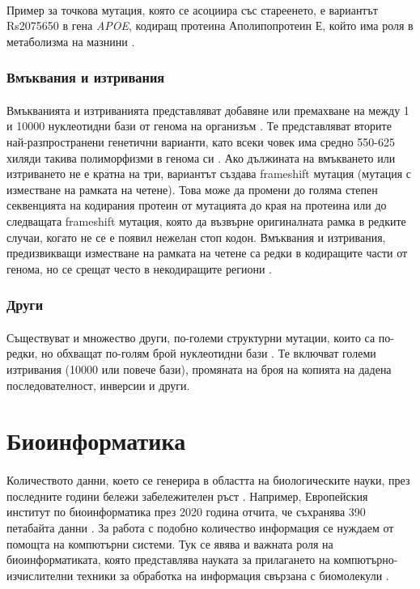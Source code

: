 \documentclass[pdftex,cyrillic,14pt,a4page,twoside,openright]{extreport}
\begin{document}
\paragraph{}
Пример за точкова мутация, която се асоциира със стареенето, е вариантът Rs2075650 в гена \textit{APOE}, кодиращ протеина Аполипопротеин Е, който има роля в метаболизма на мазнини \cite{deelen2011, lu2014}.

\subsubsection{Вмъквания и изтривания}
\paragraph{}
Вмъкванията и изтриванията представляват добавяне или премахване на между 1 и 10000 нуклеотидни бази от генома на организъм \cite{mullaney2010}. Те представляват вторите най-разпространени генетични варианти, като всеки човек има средно 550-625 хиляди такива полиморфизми в генома си \cite{auton2015}. Ако дължината на вмъкването или изтриването не е кратна на три, вариантът създава frameshift мутация (мутация с изместване на рамката на четене). Това може да промени до голяма степен секвенцията на кодирания протеин от мутацията до края на протеина или до следващата frameshift мутация, която да възвърне оригиналната рамка в редките случаи, когато не се е появил нежелан стоп кодон. Вмъквания и изтривания, предизвикващи изместване на рамката на четене са редки в кодиращите части от генома, но се срещат често в некодиращите региони \cite{bai2013}.

\subsubsection{Други}
\paragraph{}
Съществуват и множество други, по-големи структурни мутации, които са по-редки, но обхващат по-голям брой нуклеотидни бази \cite{auton2015}. Те включват големи изтривания (10000 или повече бази), промяната на броя на копията на дадена последователност, инверсии и други.

\section{Биоинформатика}
\paragraph{}
Количеството данни, което се генерира в областта на биологическите науки, през последните години бележи забележителен ръст \cite{marx2013}. Например, Европейския институт по биоинформатика през 2020 година отчита, че съхранява 390 петабайта данни \cite{embl2021}. За работа с подобно количество информация се нуждаем от помощта на компютърни системи. Тук се явява и важната роля на биоинформатиката, която представлява науката за прилагането на компютърно-изчислителни техники за обработка на информация свързана с биомолекули \cite{luscombe2001}.
\end{document}
